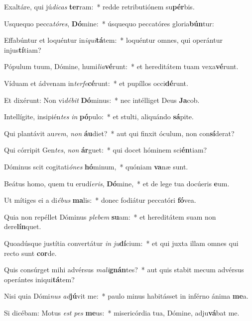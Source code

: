 \item Exaltáre, qui jú\textit{di}\textit{cas} \textbf{ter}ram:~* redde retributiónem su\textbf{pér}bis.
\item Usquequo pecca\textit{tó}\textit{res}, \textbf{Dó}mine:~* úsquequo peccatóres gloria\textbf{bún}tur:
\item Effabúntur et loquéntur in\textit{i}\textit{qui}\textbf{tá}tem:~* loquéntur omnes, qui operántur injus\textbf{tí}tiam?
\item Pópulum tuum, Dómine, humi\textit{li}\textit{a}\textbf{vé}runt:~* et hereditátem tuam vexa\textbf{vé}runt.
\item Víduam et ádvenam in\textit{ter}\textit{fe}\textbf{cé}runt:~* et pupíllos occi\textbf{dé}runt.
\item Et dixérunt: Non vi\textit{dé}\textit{bit} \textbf{Dó}minus:~* nec intélliget Deus \textbf{Ja}cob.
\item Intellígite, insipién\textit{tes} \textit{in} \textbf{pó}pulo:~* et stulti, aliquándo \textbf{sá}pite.
\item Qui plantávit au\textit{rem}, \textit{non} \textbf{áu}diet?~* aut qui finxit óculum, non con\textbf{sí}derat?
\item Qui córripit Gen\textit{tes}, \textit{non} \textbf{ár}guet:~* qui docet hóminem sci\textbf{én}tiam?
\item Dóminus scit cogitati\textit{ó}\textit{nes} \textbf{hó}minum,~* quóniam \textbf{va}næ sunt.
\item Beátus homo, quem tu erudí\textit{e}\textit{ris}, \textbf{Dó}mine,~* et de lege tua docúeris \textbf{e}um.
\item Ut mítiges ei a di\textit{é}\textit{bus} \textbf{ma}lis:~* donec fodiátur peccatóri \textbf{fó}vea.
\item Quia non repéllet Dóminus \textit{ple}\textit{bem} \textbf{su}am:~* et hereditátem suam non dere\textbf{lín}quet.
\item Quoadúsque justítia convertátur \textit{in} \textit{ju}\textbf{dí}cium:~* et qui juxta illam omnes qui recto sunt \textbf{cor}de.
\item Quis consúrget mihi advérsus \textit{ma}\textit{li}\textbf{gnán}tes?~* aut quis stabit mecum advérsus operántes iniqui\textbf{tá}tem?
\item Nisi quia Dómi\textit{nus} \textit{ad}\textbf{jú}vit me:~* paulo minus habitásset in inférno ánima \textbf{me}a.
\item Si dicébam: Motus \textit{est} \textit{pes} \textbf{me}us:~* misericórdia tua, Dómine, adju\textbf{vá}bat me.
